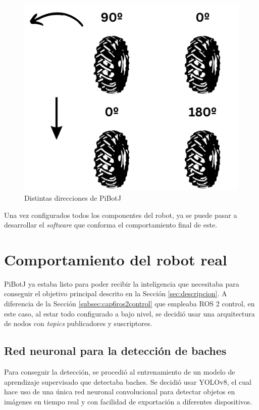 \begin{figure}[ht!]
\begin{minipage}{0.3\linewidth}
		\includegraphics[width=\linewidth]{figs/cap6/motorlogic2.png}
	\end{minipage}
	\caption{Distintas direcciones de PiBotJ}
	\label{fig:motorlogic}
\end{figure}

Una vez configurados todos los componentes del robot, ya se puede pasar a desarrollar el \textit{software} que conforma el comportamiento final de este. 
 

\section{Comportamiento del robot real}
\label{sec:softwarerf}

PiBotJ ya estaba listo para poder recibir la inteligencia que necesitaba para conseguir el objetivo principal descrito en la Sección \ref{sec:descripcion}. A diferencia de la Sección \ref{subsec:cap6ros2control} que empleaba ROS 2 control, en este caso, al estar todo configurado a bajo nivel, se decidió usar una arquitectura de nodos con \textit{topics} publicadores y suscriptores.

\subsection{Red neuronal para la detección de baches}
\label{subsec:softwareiayolo}

Para conseguir la detección, se procedió al entrenamiento de un modelo de aprendizaje supervisado que detectaba baches. Se decidió usar YOLOv8, el cual hace uso de una única red neuronal convolucional para detectar objetos en imágenes en tiempo real y con facilidad de exportación a diferentes dispositivos.

